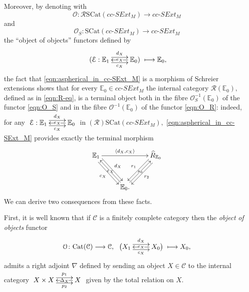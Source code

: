 \documentclass[a4paper]{amsart}
\theoremstyle{plain}
\theoremstyle{definition}
\theoremstyle{remark}
\newcommand{\la}{\langle}
\newcommand{\ra}{\rangle}
\begin{document}
Moreover, by denoting with
\begin{equation}
\label{eqn:O_R}
\mathcal{O}\colon\mathcal{R}\mathrm{SCat}(cc\text{-}SExt_M)\longrightarrow cc\text{-}SExt_M
\end{equation}
and
\begin{equation}
\label{eqn:O_S}
\mathcal{O}_S\colon\mathrm{SCat}(cc\text{-}SExt_M)\longrightarrow cc\text{-}SExt_M
\end{equation}
the ``object of objects'' functors defined by
\begin{equation*}
\xymatrix{ {(\mathcal{E}:{\mathbb{E}}_1} \ar@<.9ex>[r]^-{d_X} \ar@<-.9ex>[r]_-{c_X} &{{\mathbb{E}}_0)} \ar[l]|-{e_X}
}\longmapsto {\mathbb{E}}_0,
\end{equation*}
the fact that \eqref{eqn:aspherical_in_cc-SExt_M} is a morphism of Schreier extensions shows that for every ${\mathbb{E}}_0\in cc\text{-}SExt_M$ the internal category $\mathcal{R}({\mathbb{E}}_0),$ defined as in \eqref{eqn:R-eq}, is a terminal object both in the fibre $\mathcal{O}_S^{-1}({\mathbb{E}}_0)$ of the functor \eqref{eqn:O_S} and in the fibre $\mathcal{O}^{-1}({\mathbb{E}}_0)$ of the functor \eqref{eqn:O_R}: indeed, for any $\xymatrix{ {\mathcal{E}:{\mathbb{E}}_1} \ar@<.9ex>[r]^-{d_X} \ar@<-.9ex>[r]_-{c_X} &{{\mathbb{E}}_0} \ar[l]|-{e_X}
}$ in $(\mathcal{R})\mathrm{SCat}(cc\text{-}SExt_M),$ \eqref{eqn:aspherical_in_cc-SExt_M} provides exactly the terminal morphism
\begin{equation*}
\xymatrixrowsep{2.5pc}
\xymatrix{
{{\mathbb{E}}_1} \ar@<.9ex>[rd]^-{d_X} \ar@<-.9ex>[rd]_-{c_X} \ar[rr]^-{\la d_X,c_X\ra} &\ &{\widehat{R}_{{\mathbb{E}}_0}} \ar@<.9ex>[dl]^-{r_2} \ar@<-.9ex>[dl]_-{r_1} \\
&{{\mathbb{E}}_0.} \ar[lu]|-{e_X} \ar[ru]|-{s_0} &\
}
\end{equation*}
We can derive two consequences from these facts.

First, it is well known that if $\mathcal{C}$ is a finitely complete category then the \emph{object of objects} functor
\begin{equation}
\label{eqn:O_general}
\mathcal{O}\colon\mathrm{Cat}(\mathcal{C})\longrightarrow\mathcal{C}, \ \xymatrix{{\big(X_1} \ar@<.9ex>[r]^-{d_X} \ar@<-.9ex>[r]_-{c_X} &{X_0\big)} \ar[l]|-{e_X} }\longmapsto X_0,
\end{equation}
admits a right adjoint $\nabla$ defined by sending an object $X\in\mathcal{C}$ to the internal category $\xymatrix{{X\times X} \ar@<.9ex>[r]^-{p_1} \ar@<-.9ex>[r]_-{p_2} &X \ar[l]|-{\Delta_X}}$ given by the total relation on $X.$
\end{document}
